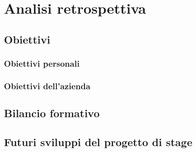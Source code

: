 \chapter{Analisi retrospettiva}
\section{Obiettivi}
\subsection{Obiettivi personali}
\subsection{Obiettivi dell'azienda}


\section{Bilancio formativo}

\section{Futuri sviluppi del progetto di stage}
